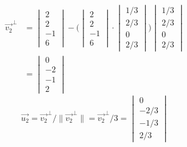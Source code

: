 \documentclass[letterpaper,12pt]{article}
\begin{document}
\begin{align*}
\vec{v_2}^{\perp} & =
\begin{vmatrix}
2 \\
2 \\
-1 \\
6
\end{vmatrix}
- \Bigg(
\begin{vmatrix}
2 \\
2 \\
-1 \\
6
\end{vmatrix}
\cdot
\begin{vmatrix}
1/3 \\
2/3 \\
0 \\
2/3
\end{vmatrix}
\Bigg)
\begin{vmatrix}
1/3 \\
2/3 \\
0 \\
2/3
\end{vmatrix} \\
& =
\begin{vmatrix}
0 \\
-2 \\
-1 \\
2
\end{vmatrix}
\end{align*}
\begin{equation*}
\vec{u_2} =
\vec{v_2}^{\perp} / \| \vec{v_2}^{\perp} \| =
\vec{v_2}^{\perp} / 3 =
\begin{vmatrix}
0 \\
-2/3 \\
-1/3 \\
2/3
\end{vmatrix}
\end{equation*}
\end{document}
